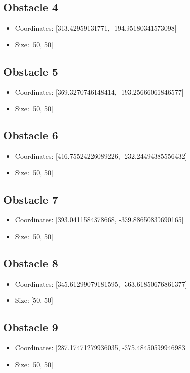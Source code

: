 \documentclass{article}
\begin{document}
\subsection*{Obstacle 4}
\begin{itemize}
\item Coordinates: [313.42959131771, -194.95180341573098]
\item Size: [50, 50]
\end{itemize}
\subsection*{Obstacle 5}
\begin{itemize}
\item Coordinates: [369.3270746148414, -193.25666066846577]
\item Size: [50, 50]
\end{itemize}
\subsection*{Obstacle 6}
\begin{itemize}
\item Coordinates: [416.75524226089226, -232.24494385556432]
\item Size: [50, 50]
\end{itemize}
\subsection*{Obstacle 7}
\begin{itemize}
\item Coordinates: [393.0411584378668, -339.88650830690165]
\item Size: [50, 50]
\end{itemize}
\subsection*{Obstacle 8}
\begin{itemize}
\item Coordinates: [345.61299079181595, -363.61850676861377]
\item Size: [50, 50]
\end{itemize}
\subsection*{Obstacle 9}
\begin{itemize}
\item Coordinates: [287.17471279936035, -375.48450599946983]
\item Size: [50, 50]
\end{itemize}
\end{document}
